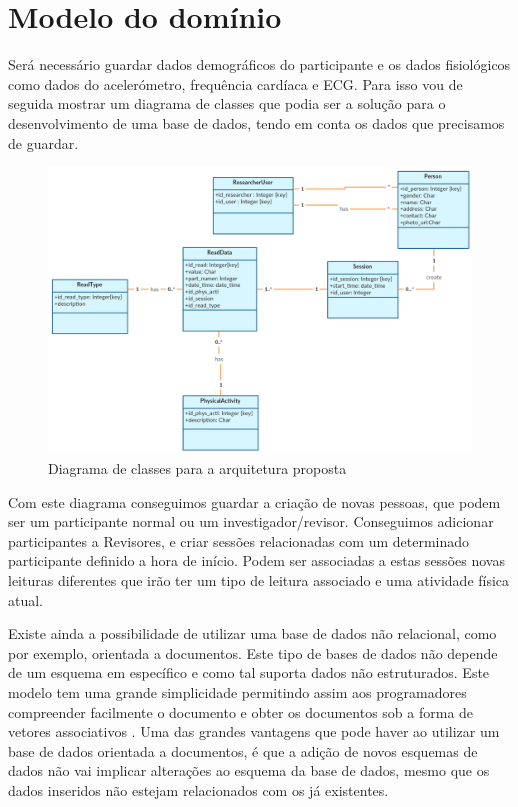 \section{Modelo do domínio}
Será necessário guardar dados demográficos do participante e os dados fisiológicos como dados do acelerómetro, frequência cardíaca e \gls{ECG}. Para isso vou de seguida mostrar um diagrama de classes que podia ser a solução para o desenvolvimento de uma base de dados, tendo em conta os dados que precisamos de guardar.

\begin{figure}[H]
  \centering
  \includegraphics[width=1\textwidth]{imgs/class-diagram.png}
  \caption[Diagrama de classes para a arquitetura proposta]{Diagrama de classes para a arquitetura proposta}
  
  \label{f:class-diagram}
\end{figure}

Com este diagrama conseguimos guardar a criação de novas pessoas, que podem ser um participante normal ou um investigador/revisor. Conseguimos adicionar participantes a Revisores, e criar sessões relacionadas com um determinado participante definido a hora de início. Podem ser associadas a estas sessões novas leituras diferentes que irão ter um tipo de leitura associado e uma atividade física atual.
\par 
Existe ainda a possibilidade de utilizar uma base de dados não relacional, como por exemplo, orientada a documentos. Este tipo de bases de dados não depende de um esquema em específico e como tal suporta dados não estruturados. Este modelo tem uma grande simplicidade permitindo assim aos programadores compreender facilmente o documento e obter os documentos sob a forma de vetores associativos \cite{nosql}. Uma das grandes vantagens que pode haver ao utilizar um base de dados orientada a documentos, é que a adição de novos esquemas de dados não vai implicar alterações ao esquema da base de dados, mesmo que os dados inseridos não estejam relacionados com os já existentes.





